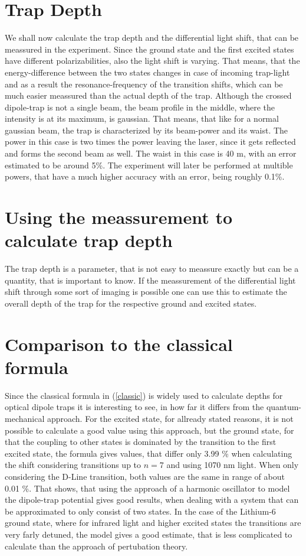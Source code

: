 \section{Trap Depth}

We shall now calculate the trap depth and the differential light shift, that can be meassured in the experiment. Since the ground state and the first excited states have different polarizabilities, also the light shift is varying. That means, that the energy-difference between the two states changes in case of incoming trap-light and as a result the resonance-frequency of the transition shifts, which can be much easier meassured than the actual depth of the trap. Although the crossed dipole-trap is not a single beam, the beam profile in the middle, where the intensity is at its maximum, is gaussian. That means, that like for a normal gaussian beam, the trap is characterized by its beam-power and its waist. The power in this case is two times the power leaving the laser, since it gets reflected and forms the second beam as well. The waist in this case is 40 \mu m, with an error estimated to be around 5\%. The experiment will later be performed at multible powers, that have a much higher accuracy with an error, being roughly 0.1\%.

\section{Using the meassurement to calculate trap depth}

The trap depth is a parameter, that is not easy to meassure exactly but can be a quantity, that is important to know. If the meassurement of the differential light shift through some sort of imaging is possible one can use this to estimate the overall depth of the trap for the respective ground and excited states.

\section{Comparison to the classical formula}

Since the classical formula in (\ref{classic}) is widely used to calculate depths for optical dipole traps it is interesting to see, in how far it differs from the quantum-mechanical approach. For the excited state, for allready stated reasons, it is not possible to calculate a good value using this approach, but the ground state, for that the coupling to other states is dominated by the transition to the first excited state, the formula gives values, that differ only 3.99 \% when calculating the shift considering transitions up to $n=7$ and using 1070 nm light. When only considering the D-Line transition, both values are the same in range of about 0.01 \%. That shows, that using the approach of a harmonic oscillator to model the dipole-trap potential gives good results, when dealing with a system that can be approximated to only consist of two states. In the case of the Lithium-6 ground state, where for infrared light and higher excited states the transitions are very farly detuned, the model gives a good estimate, that is less complicated to calculate than the approach of pertubation theory.